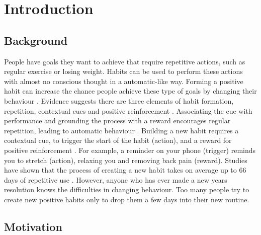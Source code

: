 
\section{Introduction}

\subsection*{Background}
People have goals they want to achieve that require repetitive actions, such as regular exercise or losing weight. Habits can be used to perform these actions with almost no conscious thought in a automatic-like way. Forming a positive habit can increase the chance people achieve these type of goals by changing their behaviour \cite{article_promoting_habit_formation}. Evidence suggests there are three elements of habit formation, repetition, contextual cues and positive reinforcement \cite{article_beyond_self_tracking_designing_apps}. Associating the cue with performance and grounding the process with a reward encourages regular repetition, leading to automatic behaviour \cite{article_experiences_of_habit_formation}. Building a new habit requires a contextual cue, to trigger the start of the habit (action), and a reward for positive reinforcement \cite{article_beyond_self_tracking_designing_apps, article_how_habits_formed_modelling_habit_formation}. For example, a reminder on your phone (trigger) reminds you to stretch (action), relaxing you and removing back pain (reward). Studies have shown that the process of creating a new habit takes on average up to 66 days of repetitive use \cite{article_how_habits_formed_modelling_habit_formation}. However, anyone who has ever made a new years resolution knows the difficulties in changing behaviour. Too many people try to create new positive habits only to drop them a few days into their new routine.

\subsection*{Motivation}

